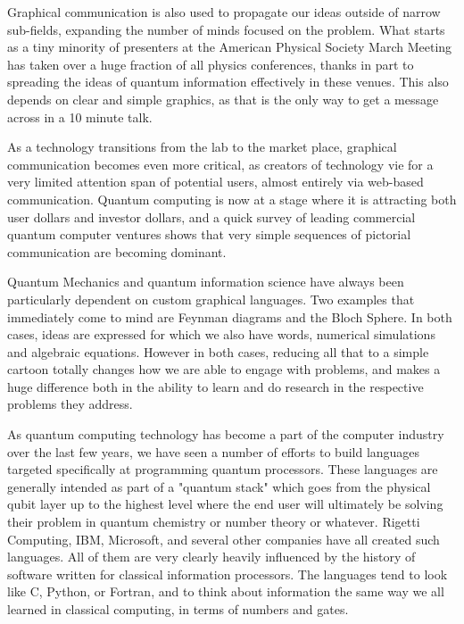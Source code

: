\documentclass[11pt]{article}
\begin{document}
    Graphical communication is also used to propagate our ideas outside of narrow sub-fields, expanding the number of minds focused on the problem.  What starts as a tiny minority of presenters at the American Physical Society March Meeting has taken over a huge fraction of all physics conferences, thanks in part to spreading the ideas of quantum information effectively in these venues.  This also depends on clear and simple graphics, as that is the only way to get a message across in a 10 minute talk.  




    As a technology transitions from the lab to the market place, graphical communication becomes even more critical, as creators of technology vie for a very limited attention span of potential users, almost entirely via web-based communication.  Quantum computing is now at a stage where it is attracting both user dollars and investor dollars, and a quick survey of leading commercial quantum computer ventures shows that very simple sequences of pictorial communication are becoming dominant.    




    Quantum Mechanics and quantum information science have always been particularly dependent on custom graphical languages.  Two examples that immediately come to mind are Feynman diagrams and the Bloch Sphere.  In both cases, ideas are expressed for which we also have words, numerical simulations and algebraic equations.  However in both cases, reducing all that to a simple cartoon totally changes how we are able to engage with problems, and makes a huge difference both in the ability to learn and do research in the respective problems they address.




    As quantum computing technology has become a part of the computer industry over the last few years, we have seen a number of efforts to build languages targeted specifically at programming quantum processors.  These languages are generally intended as part of a "quantum stack" which goes from the physical qubit layer up to the highest level where the end user will ultimately be solving their problem in quantum chemistry or number theory or whatever.  Rigetti Computing, IBM, Microsoft, and several other companies have all created such languages.  All of them are very clearly heavily influenced by the history of software written for classical information processors. The languages tend to look like C, Python, or Fortran, and to think about information the same way we all learned in classical computing, in terms of numbers and gates.  
\end{document}
